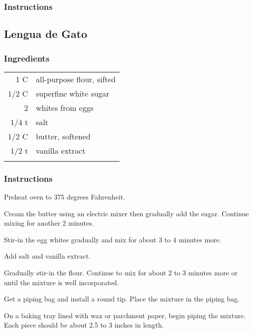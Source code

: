 \documentclass[12pt,landscape,twoside,twocolumn, openright, titlepage, draft]{book}
\begin{document}
\subsubsection{Instructions}

\subsection{Lengua de Gato}
\subsubsection{Ingredients}
\begin{tabular}{r p{1.5in}} \\
  1 C     & all-purpose flour, sifted \\
  $1/2$ C & superfine white sugar \\
  2       & whites from eggs \\
  $1/4$ t & salt \\
  $1/2$ C & butter, softened \\
  $1/2$ t & vanilla extract \\ \\
\end{tabular}

\subsubsection{Instructions}

\par Preheat oven to 375 degrees Fahrenheit.

\par Cream the butter using an electric mixer then gradually add the
sugar. Continue mixing for another 2 minutes.

\par Stir-in the egg whites gradually and mix for about 3 to 4 minutes
more.

\par Add salt and vanilla extract.

\par Gradually stir-in the flour. Continue to mix for about 2 to 3
minutes more or until the mixture is well incorporated.

\par Get a piping bag and install a round tip. Place the mixture in
the piping bag.

\par On a baking tray lined with wax or parchment paper, begin piping
the mixture. Each piece should be about 2.5 to 3 inches in length.  
\end{document}
